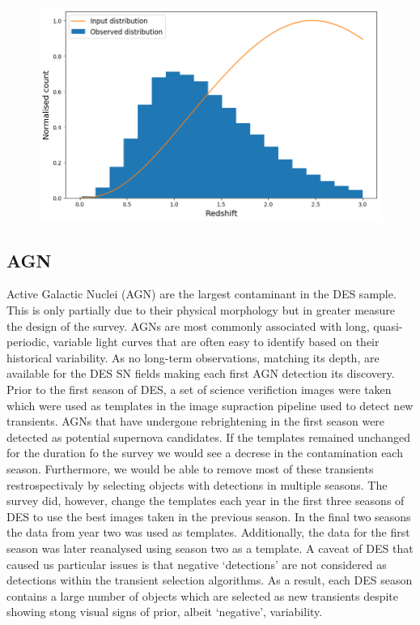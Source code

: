 \begin{figure}
  \includegraphics[width=\textwidth]{Figures/Chapter5/SLSN_z_dist.png}
  \caption{}
  \label{fig:SLSNDist}
\end{figure}

\subsection{AGN}
Active Galactic Nuclei (AGN) are the largest contaminant in the DES sample. This is only partially due to their physical morphology but in greater measure the design of the survey. AGNs are most commonly associated with long, quasi-periodic, variable light curves that are often easy to identify based on their historical variability. As no long-term observations, matching its depth, are available for the DES SN fields making each first AGN detection its discovery. Prior to the first season of DES, a set of science verifiction images were taken which were used as templates in the image supraction pipeline used to detect new transients. AGNs that have undergone rebrightening in the first season were detected as potential supernova candidates. If the templates remained unchanged for the duration fo the survey we would see a decrese in the contamination each season. Furthermore, we would be able to remove most of these transients restrospectivaly by selecting objects with detections in multiple seasons. The survey did, however, change the templates each year in the first three seasons of DES to use the best images taken in the previous season. In the final two seasons the data from year two was used as templates. Additionally, the data for the first season was later reanalysed using season two as a template. A caveat of DES that caused us particular issues is that negative `detections' are not considered as detections within the transient selection algorithms. As a result, each DES season contains a large number of objects which are selected as new transients despite showing stong visual signs of prior, albeit `negative', variability.

